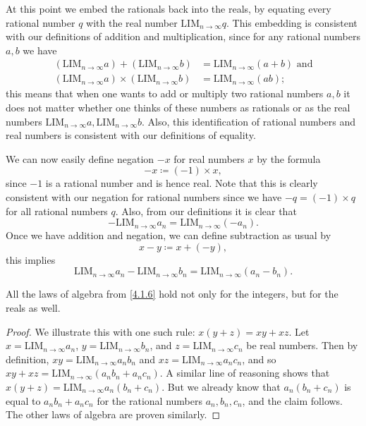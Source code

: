 \begin{note}
  At this point we embed the rationals back into the reals, by equating every rational number \(q\) with the real number \(\text{LIM}_{n \to \infty} q\).
  This embedding is consistent with our definitions of addition and multiplication, since for any rational numbers \(a, b\) we have
  \begin{align*}
    (\text{LIM}_{n \to \infty} a) + (\text{LIM}_{n \to \infty} b)      & = \text{LIM}_{n \to \infty} (a + b) \text{ and} \\
    (\text{LIM}_{n \to \infty} a) \times (\text{LIM}_{n \to \infty} b) & = \text{LIM}_{n \to \infty} (ab);
  \end{align*}
  this means that when one wants to add or multiply two rational numbers \(a, b\) it does not matter whether one thinks of these numbers as rationals or as the real numbers \(\text{LIM}_{n \to \infty} a, \text{LIM}_{n \to \infty} b\).
  Also, this identification of rational numbers and real numbers is consistent with our definitions of equality.
\end{note}

\begin{note}
  We can now easily define negation \(-x\) for real numbers \(x\) by the formula
  \[
    -x \coloneqq (-1) \times x,
  \]
  since \(-1\) is a rational number and is hence real.
  Note that this is clearly consistent with our negation for rational numbers since we have \(-q = (-1) \times q\) for all rational numbers \(q\).
  Also, from our definitions it is clear that
  \[
    -\text{LIM}_{n \to \infty} a_n = \text{LIM}_{n \to \infty} (-a_n).
  \]
  Once we have addition and negation, we can define subtraction as usual by
  \[
    x - y \coloneqq x + (-y),
  \]
  this implies
  \[
    \text{LIM}_{n \to \infty} a_n - \text{LIM}_{n \to \infty} b_n = \text{LIM}_{n \to \infty} (a_n - b_n).
  \]
\end{note}

\begin{prop}\label{5.3.11}
  All the laws of algebra from \cref{4.1.6} hold not only for the integers, but for the reals as well.
\end{prop}

\begin{proof}
  We illustrate this with one such rule: \(x(y + z) = xy + xz\).
  Let \(x = \text{LIM}_{n \to \infty} a_n\), \(y = \text{LIM}_{n \to \infty} b_n\), and \(z = \text{LIM}_{n \to \infty} c_n\) be real numbers.
  Then by definition, \(xy = \text{LIM}_{n \to \infty} a_n b_n\) and \(xz = \text{LIM}_{n \to \infty} a_n c_n\), and so \(xy + xz = \text{LIM}_{n \to \infty} (a_n b_n + a_n c_n)\).
  A similar line of reasoning shows that \(x(y + z) = \text{LIM}_{n \to \infty} a_n (b_n + c_n)\).
  But we already know that \(a_n (b_n + c_n)\) is equal to \(a_n b_n + a_n c_n\) for the rational numbers \(a_n, b_n, c_n\), and the claim follows.
  The other laws of algebra are proven similarly.
\end{proof}

